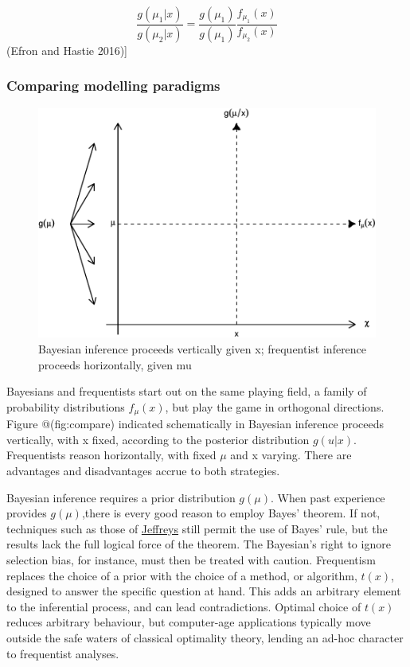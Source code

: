 \documentclass{article}
\begin{document}
\[\frac{g(\mu_1|x)}{g(\mu_2|x)}=\frac{g(\mu_1)}{g(\mu_1)}\frac{f_{\mu_1}(x)}{f_{\mu_2}(x)}\]
(Efron and Hastie 2016){]}

\hypertarget{comparing-modelling-paradigms}{%
\subsubsection{Comparing modelling
paradigms}\label{comparing-modelling-paradigms}}

\begin{figure}

{\centering \includegraphics{qrap_paper_files/figure-latex/compare-1} 

}

\caption{Bayesian inference proceeds vertically given x; frequentist inference proceeds horizontally, given mu}\label{fig:compare}
\end{figure}

Bayesians and frequentists start out on the same playing field, a family
of probability distributions \(f_{\mu}(x)\), but play the game in
orthogonal directions. Figure @(fig:compare) indicated schematically in
Bayesian inference proceeds vertically, with x fixed, according to the
posterior distribution \(g(u|x)\). Frequentists reason horizontally,
with fixed \(\mu\) and x varying. There are advantages and disadvantages
accrue to both strategies.

Bayesian inference requires a prior distribution \(g(\mu)\). When past
experience provides \(g(\mu)\),there is every good reason to employ
Bayes' theorem. If not, techniques such as those of
\href{https://en.wikipedia.org/wiki/Jeffreys_prior}{Jeffreys} still
permit the use of Bayes' rule, but the results lack the full logical
force of the theorem. The Bayesian's right to ignore selection bias, for
instance, must then be treated with caution. Frequentism replaces the
choice of a prior with the choice of a method, or algorithm, \(t(x)\),
designed to answer the specific question at hand. This adds an arbitrary
element to the inferential process, and can lead contradictions. Optimal
choice of \(t(x)\) reduces arbitrary behaviour, but computer-age
applications typically move outside the safe waters of classical
optimality theory, lending an ad-hoc character to frequentist analyses.
\end{document}
